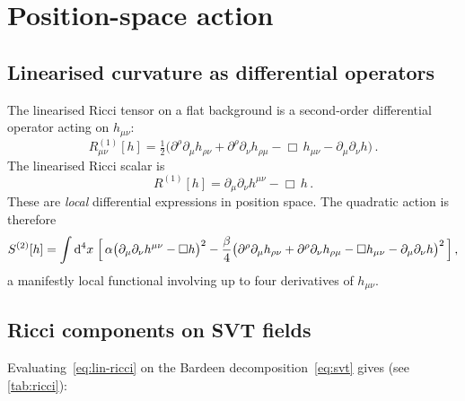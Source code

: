 \documentclass[11pt,a4paper]{article}
\newcommand{\dd}{\mathrm{d}}
\theoremstyle{definition}
\theoremstyle{remark}
\begin{document}
\section{Position-space action}
\label{sec:action}

\subsection{Linearised curvature as differential operators}

The linearised Ricci tensor on a flat background is a second-order
differential operator acting on $h_{\mu\nu}$:
\begin{equation}\label{eq:lin-ricci}
  R^{(1)}_{\mu\nu}[h]
  = \tfrac{1}{2}\bigl(
      \partial^\rho\partial_\mu h_{\rho\nu}
    + \partial^\rho\partial_\nu h_{\rho\mu}
    - \Box\, h_{\mu\nu}
    - \partial_\mu\partial_\nu h
  \bigr)\,.
\end{equation}
The linearised Ricci scalar is
\begin{equation}\label{eq:lin-R}
  R^{(1)}[h] = \partial_\mu\partial_\nu h^{\mu\nu} - \Box\, h\,.
\end{equation}
These are \emph{local} differential expressions in position space.
The quadratic action is therefore
\begin{equation}\label{eq:action-pos}
  S^{(2)}[h] = \int\dd^4x\;\Bigl[\,
    \alpha\bigl(\partial_\mu\partial_\nu h^{\mu\nu} - \Box h\bigr)^2
  - \frac{\beta}{4}
    \bigl(\partial^\rho\partial_\mu h_{\rho\nu}
         + \partial^\rho\partial_\nu h_{\rho\mu}
         - \Box h_{\mu\nu}
         - \partial_\mu\partial_\nu h\bigr)^2
  \,\Bigr]\,,
\end{equation}
a manifestly local functional involving up to four derivatives of
$h_{\mu\nu}$.

\subsection{Ricci components on SVT fields}

Evaluating~\eqref{eq:lin-ricci} on the Bardeen decomposition~\eqref{eq:svt}
gives (see \cref{tab:ricci}):
\end{document}
